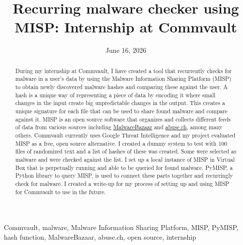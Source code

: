 \documentclass[12pt,conference,onecolumn]{IEEEtran}
\title{Recurring malware checker using MISP: Internship at Commvault}
\author{%
\IEEEauthorblockN{Ethan Fuks}\IEEEauthorblockA{Science \& Engineering\\Manalapan High School\\Englishtown, NJ\\\href{mailto:426efuks@frhsd.com}{426efuks@frhsd.com}}}
\date{June 16, 2026}
\newcommand{\keywords}{Commvault, malware, Malware Information Sharing Platform, MISP, PyMISP, hash function, MalwareBazaar, abuse.ch, open source, internship}
\begin{document}
\maketitle 

\begin{abstract}
During my internship at Commvault, I have created a tool that recurrently checks for malware in a user’s data by using the Malware Information Sharing Platform (MISP) to obtain newly discovered malware hashes and comparing these against the user. A hash is a unique way of representing a piece of data by encoding it where small changes in the input create big unpredictable changes in the output. This creates a unique signature for each file that can be used to share found malware and compare against it. MISP is an open source software that organizes and collects different feeds of data from various sources including \href{https://bazaar.abuse.ch}{MalwareBazaar} and \href{https://abuse.ch}{abuse.ch}, among many others. Commvault currently uses Google Threat Intelligence and my project evaluated MISP as a free, open source alternative. I created a dummy system to test with 100 files of randomized text and a list of hashes of these was created. Some were selected as malware and were checked against the list. I set up a local instance of MISP in Virtual Box that is perpetually running and able to be queried for found malware. PyMISP, a Python library to query MISP, is used to connect these parts together and recurringly check for malware. I created a write-up for my process of setting up and using MISP for Commvault to use in the future. 
\end{abstract}

\begin{IEEEkeywords}
\keywords
\end{IEEEkeywords}
\end{document}
